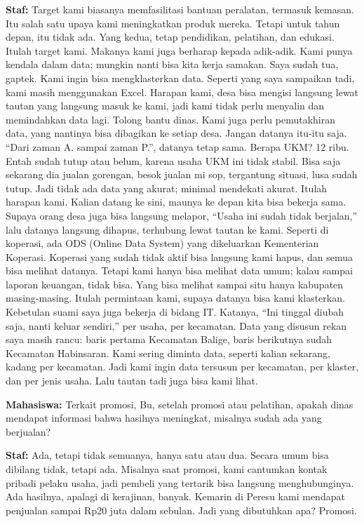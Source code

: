 {\noindent \textbf{Staf:} Target kami biasanya memfasilitasi bantuan peralatan, termasuk kemasan. Itu salah satu upaya kami meningkatkan produk mereka. Tetapi untuk tahun depan, itu tidak ada. Yang kedua, tetap pendidikan, pelatihan, dan edukasi. Itulah target kami. Makanya kami juga berharap kepada adik-adik. Kami punya kendala dalam data; mungkin nanti bisa kita kerja samakan. Saya sudah tua, gaptek. Kami ingin bisa mengklasterkan data. Seperti yang saya sampaikan tadi, kami masih menggunakan Excel. Harapan kami, desa bisa mengisi langsung lewat tautan yang langsung masuk ke kami, jadi kami tidak perlu menyalin dan memindahkan data lagi. Tolong bantu dinas. Kami juga perlu pemutakhiran data, yang nantinya bisa dibagikan ke setiap desa. Jangan datanya itu-itu saja. ``Dari zaman A. sampai zaman P.'', datanya tetap sama. Berapa UKM? 12 ribu. Entah sudah tutup atau belum, karena usaha UKM ini tidak stabil. Bisa saja sekarang dia jualan gorengan, besok jualan mi sop, tergantung situasi, lusa sudah tutup. Jadi tidak ada data yang akurat; minimal mendekati akurat. Itulah harapan kami. Kalian datang ke sini, maunya ke depan kita bisa bekerja sama. Supaya orang desa juga bisa langsung melapor, ``Usaha ini sudah tidak berjalan,'' lalu datanya langsung dihapus, terhubung lewat tautan ke kami. Seperti di koperasi, ada ODS (Online Data System) yang dikeluarkan Kementerian Koperasi. Koperasi yang sudah tidak aktif bisa langsung kami hapus, dan semua bisa melihat datanya. Tetapi kami hanya bisa melihat data umum; kalau sampai laporan keuangan, tidak bisa. Yang bisa melihat sampai situ hanya kabupaten masing-masing. Itulah permintaan kami, supaya datanya bisa kami klasterkan. Kebetulan suami saya juga bekerja di bidang IT. Katanya, ``Ini tinggal diubah saja, nanti keluar sendiri,'' per usaha, per kecamatan. Data yang disusun rekan saya masih rancu: baris pertama Kecamatan Balige, baris berikutnya sudah Kecamatan Habinsaran. Kami sering diminta data, seperti kalian sekarang, kadang per kecamatan. Jadi kami ingin data tersusun per kecamatan, per klaster, dan per jenis usaha. Lalu tautan tadi juga bisa kami lihat.

\noindent \textbf{Mahasiswa:} Terkait promosi, Bu, setelah promosi atau pelatihan, apakah dinas mendapat informasi bahwa hasilnya meningkat, misalnya sudah ada yang berjualan?

\noindent \textbf{Staf:} Ada, tetapi tidak semuanya, hanya satu atau dua. Secara umum bisa dibilang tidak, tetapi ada. Misalnya saat promosi, kami cantumkan kontak pribadi pelaku usaha, jadi pembeli yang tertarik bisa langsung menghubunginya. Ada hasilnya, apalagi di kerajinan, banyak. Kemarin di Peresu kami mendapat penjualan sampai Rp20 juta dalam sebulan. Jadi yang dibutuhkan apa? Promosi.

}
